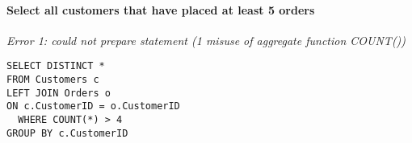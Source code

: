 \paragraph{Select all customers that have placed at least 5 orders}
\textit{Error 1: could not prepare statement (1 misuse of aggregate function COUNT())}
\begin{lstlisting}[label={sqlstatement4}]
SELECT DISTINCT *
FROM Customers c
LEFT JOIN Orders o
ON c.CustomerID = o.CustomerID
  WHERE COUNT(*) > 4
GROUP BY c.CustomerID 
\end{lstlisting}

